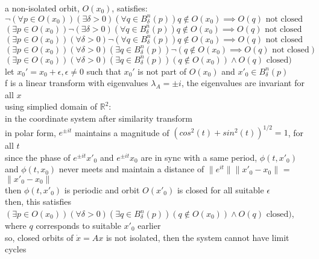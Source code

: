 \documentclass[12pt,letter]{article}
\newcommand{\R}{\mathbb{R}}
\begin{document}
\begin{itemize}
\begin{itemize}
  a non-isolated orbit, $O(x_0)$, satisfies:\\
  $\neg(\forall p \in O(x_0))(\exists \delta > 0)(\forall q \in B_{\delta}^n(p)) q \notin O(x_0) \implies O(q) \text{ not closed}$\\
  $(\exists p \in O(x_0))\neg(\exists \delta > 0)(\forall q \in B_{\delta}^n(p)) q \notin O(x_0) \implies O(q) \text{ not closed}$\\
  $(\exists p \in O(x_0))(\forall \delta > 0)\neg(\forall q \in B_{\delta}^n(p)) q \notin O(x_0) \implies O(q) \text{ not closed}$\\
  $(\exists p \in O(x_0))(\forall \delta > 0)(\exists q \in B_{\delta}^n(p)) \neg(q \notin O(x_0) \implies O(q) \text{ not closed})$\\
  $(\exists p \in O(x_0))(\forall \delta > 0)(\exists q \in B_{\delta}^n(p)) (q \notin O(x_0)) \wedge O(q) \text{ closed})$\\

  let $x_0'=x_0+\epsilon, \epsilon \neq 0$ such that $x_0'$ is not part of $O(x_0)$ and $x'_0 \in B_{\delta}^n(p)$\\

  f is a linear transform with eigenvalues $\lambda_A = \pm i$, the eigenvalues are invariant for all $x$\\

  using simplied domain of $\R^2$:\\
  in the coordinate system after similarity transform\\
  
  in polar form, $e^{\pm it}$ maintains a magnitude of $(cos^2(t)+sin^2(t))^{1/2}=1$, for all $t$\\
  
  since the phase of $e^{\pm it}x'_0$ and $e^{\pm it}x_0$ are in sync with a same period, $\phi(t,x'_0)$ and $\phi(t,x_0)$ never meets and maintain a distance of $\|e^{it}\|\|x'_0-x_0\|$ = $\|x'_0-x_0\|$\\

  then $\phi(t,x'_0)$ is periodic and orbit $O(x'_0)$ is closed for all suitable $\epsilon$\\

  then, this satisfies
  $(\exists p \in O(x_0))(\forall \delta > 0)(\exists q \in B_{\delta}^n(p)) (q \notin O(x_0)) \wedge O(q) \text{ closed})$, where $q$ corresponds to suitable $x'_0$ earlier\\

  so, closed orbits of $\dot{x}=Ax$ is not isolated, then the system cannot have limit cycles\\


\end{itemize}
\end{itemize}
\end{document}
